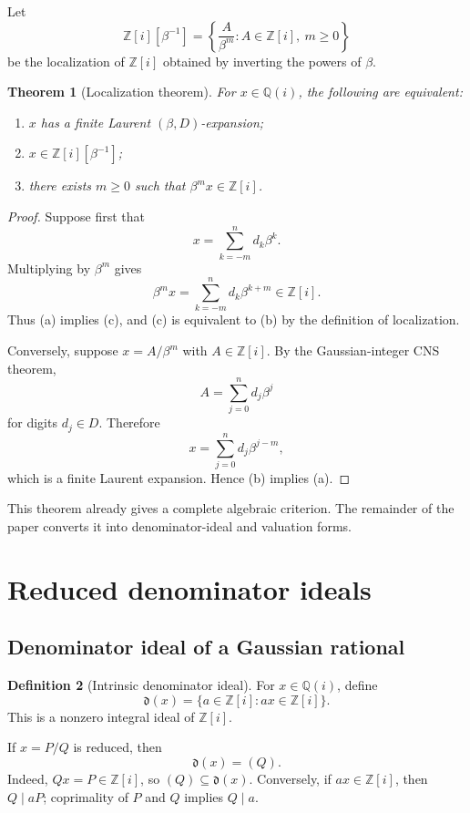 \documentclass[11pt]{article}
\newtheorem{theorem}{Theorem}[section]
\theoremstyle{definition}
\newtheorem{definition}[theorem]{Definition}
\newcommand{\Zi}{\mathbb{Z}[i]}
\newcommand{\Qi}{\mathbb{Q}(i)}
\begin{document}
Let
\[
\Zi[\beta^{-1}]
=
\left\{\frac{A}{\beta^m}:A\in\Zi,\ m\ge0\right\}
\]
be the localization of $\Zi$ obtained by inverting the powers of $\beta$.

\begin{theorem}[Localization theorem]
For $x\in\Qi$, the following are equivalent:
\begin{enumerate}[label=(\alph*)]
\item $x$ has a finite Laurent $(\beta,D)$-expansion;
\item $x\in\Zi[\beta^{-1}]$;
\item there exists $m\ge0$ such that $\beta^m x\in\Zi$.
\end{enumerate}
\label{thm:localization}
\end{theorem}

\begin{proof}
Suppose first that
\[
x=\sum_{k=-m}^{n}d_k\beta^k.
\]
Multiplying by $\beta^m$ gives
\[
\beta^m x=\sum_{k=-m}^{n}d_k\beta^{k+m}\in\Zi.
\]
Thus (a) implies (c), and (c) is equivalent to (b) by the definition of localization.

Conversely, suppose $x=A/\beta^m$ with $A\in\Zi$.  By the Gaussian-integer CNS theorem,
\[
A=\sum_{j=0}^{n}d_j\beta^j
\]
for digits $d_j\in D$.  Therefore
\[
x=\sum_{j=0}^{n}d_j\beta^{j-m},
\]
which is a finite Laurent expansion.  Hence (b) implies (a).
\end{proof}

This theorem already gives a complete algebraic criterion.  The remainder of the paper converts it into denominator-ideal and valuation forms.

\section{Reduced denominator ideals}

\subsection{Denominator ideal of a Gaussian rational}

\begin{definition}[Intrinsic denominator ideal]
For $x\in\Qi$, define
\[
\mathfrak d(x)=\{a\in\Zi:ax\in\Zi\}.
\]
This is a nonzero integral ideal of $\Zi$.
\end{definition}

If $x=P/Q$ is reduced, then
\begin{equation}
\mathfrak d(x)=(Q).
\label{eq:denominator-ideal}
\end{equation}
Indeed, $Qx=P\in\Zi$, so $(Q)\subseteq\mathfrak d(x)$.  Conversely, if $ax\in\Zi$, then $Q\mid aP$; coprimality of $P$ and $Q$ implies $Q\mid a$.
\end{document}
